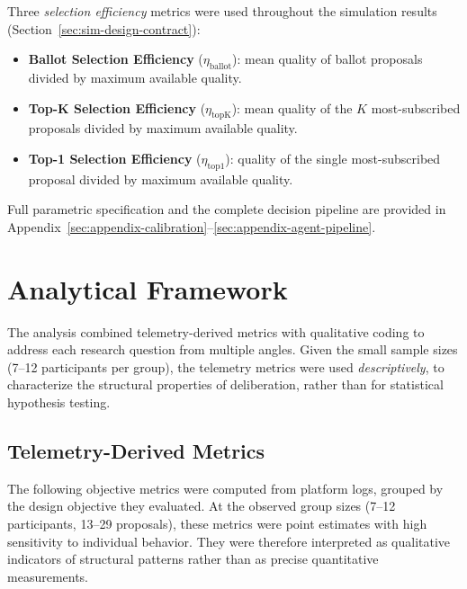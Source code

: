 \documentclass[a4paper, 12pt, twoside]{iviathesis}
\begin{document}
\noindent Three \textit{selection efficiency} metrics were used throughout the simulation results (Section~\ref{sec:sim-design-contract}):
\begin{itemize}
    \item \textbf{Ballot Selection Efficiency} ($\eta_{\text{ballot}}$): mean quality of ballot proposals divided by maximum available quality.
    \item \textbf{Top-K Selection Efficiency} ($\eta_{\text{topK}}$): mean quality of the $K$ most-subscribed proposals divided by maximum available quality.
    \item \textbf{Top-1 Selection Efficiency} ($\eta_{\text{top1}}$): quality of the single most-subscribed proposal divided by maximum available quality.
\end{itemize}

\noindent Full parametric specification and the complete decision pipeline are provided in Appendix~\ref{sec:appendix-calibration}--\ref{sec:appendix-agent-pipeline}.

\section{Analytical Framework}
The analysis combined telemetry-derived metrics with qualitative coding to address each research question from multiple angles. Given the small sample sizes (7--12 participants per group), the telemetry metrics were used \textit{descriptively}, to characterize the structural properties of deliberation, rather than for statistical hypothesis testing.

\subsection{Telemetry-Derived Metrics}
\label{sec:telemetry-metrics}
The following objective metrics were computed from platform logs, grouped by the design objective they evaluated. At the observed group sizes (7--12 participants, 13--29 proposals), these metrics were point estimates with high sensitivity to individual behavior. They were therefore interpreted as qualitative indicators of structural patterns rather than as precise quantitative measurements.
\end{document}
